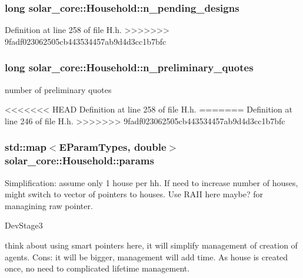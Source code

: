 \subsubsection[{n\+\_\+pending\+\_\+designs}]{\setlength{\rightskip}{0pt plus 5cm}long solar\+\_\+core\+::\+Household\+::n\+\_\+pending\+\_\+designs\hspace{0.3cm}{\ttfamily [protected]}}\label{classsolar__core_1_1_household_ac82a6ebca38ecaf971845f6fa5791559}


Definition at line 258 of file H.\+h.
>>>>>>> 9fadf023062505cb443534457ab9d4d3cc1b7bfc

\hypertarget{classsolar__core_1_1_household_aedfc08b7837a3e2fa6ad9e62309694f3}{}
\subsubsection[{n\+\_\+preliminary\+\_\+quotes}]{\setlength{\rightskip}{0pt plus 5cm}long solar\+\_\+core\+::\+Household\+::n\+\_\+preliminary\+\_\+quotes\hspace{0.3cm}{\ttfamily [protected]}}\label{classsolar__core_1_1_household_aedfc08b7837a3e2fa6ad9e62309694f3}
number of preliminary quotes 

<<<<<<< HEAD
Definition at line 258 of file H.\+h.
=======
Definition at line 246 of file H.\+h.
>>>>>>> 9fadf023062505cb443534457ab9d4d3cc1b7bfc

\hypertarget{classsolar__core_1_1_household_a41d61dc3bab971cb19170341b77d9df8}{}
\subsubsection[{params}]{\setlength{\rightskip}{0pt plus 5cm}std\+::map$<${\bf E\+Param\+Types}, double$>$ solar\+\_\+core\+::\+Household\+::params\hspace{0.3cm}{\ttfamily [protected]}}\label{classsolar__core_1_1_household_a41d61dc3bab971cb19170341b77d9df8}
Simplification\+: assume only 1 house per hh. If need to increase number of houses, might switch to vector of pointers to houses. Use R\+A\+I\+I here maybe? for managining raw pointer.\begin{DoxyRefDesc}{Dev\+Stage3}
\item[\hyperlink{_dev_stage3__DevStage3000003}{Dev\+Stage3}]think about using smart pointers here, it will simplify management of creation of agents. Cons\+: it will be bigger, management will add time. As house is created once, no need to complicated lifetime management. \end{DoxyRefDesc}


